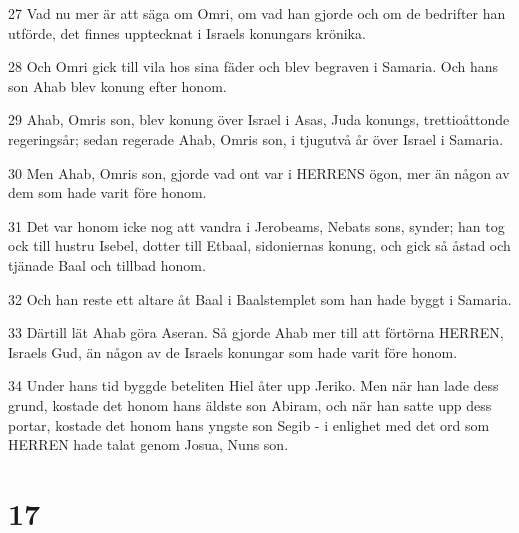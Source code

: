 \par 27 Vad nu mer är att säga om Omri, om vad han gjorde och om de bedrifter han utförde, det finnes upptecknat i Israels konungars krönika.
\par 28 Och Omri gick till vila hos sina fäder och blev begraven i Samaria. Och hans son Ahab blev konung efter honom.
\par 29 Ahab, Omris son, blev konung över Israel i Asas, Juda konungs, trettioåttonde regeringsår; sedan regerade Ahab, Omris son, i tjugutvå år över Israel i Samaria.
\par 30 Men Ahab, Omris son, gjorde vad ont var i HERRENS ögon, mer än någon av dem som hade varit före honom.
\par 31 Det var honom icke nog att vandra i Jerobeams, Nebats sons, synder; han tog ock till hustru Isebel, dotter till Etbaal, sidoniernas konung, och gick så åstad och tjänade Baal och tillbad honom.
\par 32 Och han reste ett altare åt Baal i Baalstemplet som han hade byggt i Samaria.
\par 33 Därtill lät Ahab göra Aseran. Så gjorde Ahab mer till att förtörna HERREN, Israels Gud, än någon av de Israels konungar som hade varit före honom.
\par 34 Under hans tid byggde beteliten Hiel åter upp Jeriko. Men när han lade dess grund, kostade det honom hans äldste son Abiram, och när han satte upp dess portar, kostade det honom hans yngste son Segib - i enlighet med det ord som HERREN hade talat genom Josua, Nuns son.

\chapter{17}

